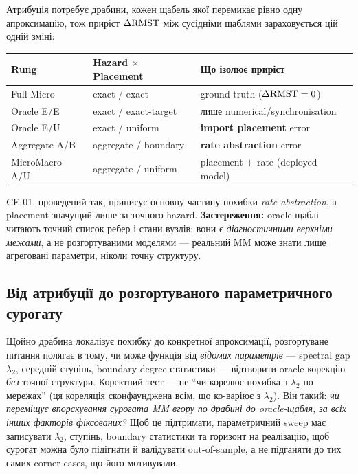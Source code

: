 \documentclass[11pt,a4paper]{article}
\begin{document}
Атрибуція потребує драбини, кожен щабель якої перемикає рівно одну апроксимацію, тож
приріст $\Delta\mathrm{RMST}$ між сусідніми щаблями зараховується цій одній зміні:

\begin{center}
\begin{tabular}{llp{6.2cm}}
\toprule
Rung & Hazard $\times$ Placement & Що ізолює приріст \\
\midrule
Full Micro                 & exact / exact     & ground truth ($\Delta\mathrm{RMST}=0$) \\
Oracle E/E                 & exact / exact-target & лише numerical/synchronisation \\
Oracle E/U                 & exact / uniform   & \textbf{import placement} error \\
Aggregate A/B              & aggregate / boundary & \textbf{rate abstraction} error \\
MicroMacro A/U             & aggregate / uniform & placement $+$ rate (deployed model) \\
\bottomrule
\end{tabular}
\end{center}

CE-01, проведений так, приписує основну частину похибки \emph{rate abstraction},
а placement значущий лише за точного hazard.  \textbf{Застереження:}
oracle-щаблі читають точний список ребер і стани вузлів; вони є \emph{діагностичними
верхніми межами}, а не розгортуваними моделями --- реальний MM може знати лише
агреговані параметри, ніколи точну структуру.

\subsection{Від атрибуції до розгортуваного параметричного сурогату}
\label{sec:surrogate}

Щойно драбина локалізує похибку до конкретної апроксимації, розгортуване
питання полягає в тому, чи може функція від \emph{відомих параметрів} ---
spectral gap $\lambda_2$, середній ступінь, boundary-degree статистики --- відтворити
oracle-корекцію \emph{без} точної структури.  Коректний тест --- не
``чи корелює похибка з $\lambda_2$ по мережах'' (ця кореляція
сконфаунджена всім, що ко-варіює з $\lambda_2$).  Він такий: \emph{чи
переміщує впорскування сурогата MM вгору по драбині до oracle-щабля, за всіх
інших факторів фіксованих?}  Щоб це підтримати, параметричний sweep має записувати
$\lambda_2$, ступінь, boundary статистики та горизонт на реалізацію, щоб
сурогат можна було підігнати й валідувати out-of-sample, а не підганяти до
тих самих corner cases, що його мотивували.
\end{document}
